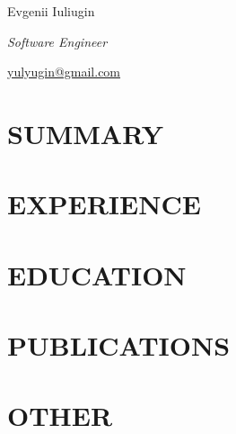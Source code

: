 ﻿\documentclass[10pt, a4paper, oneside]{article}
\begin{document}
\Huge
Evgenii Iuliugin

\LARGE
\textit{Software Engineer}

\begin{flushright}
  \large
  \href{mailto:yulyugin@gmail.com}{yulyugin@gmail.com}

\end{flushright}

\section*{SUMMARY}

\section*{EXPERIENCE}

\section*{EDUCATION}

\section*{PUBLICATIONS}

\section*{OTHER}
\end{document}
